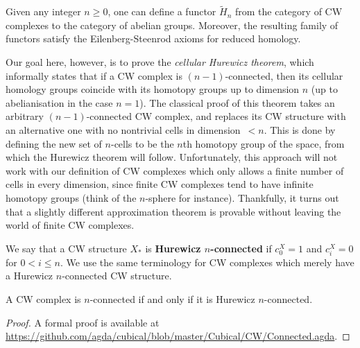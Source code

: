 \documentclass[a4page]{article}
\begin{document}
\begin{proposition}
  Given any integer \( n \ge 0 \), one can define a functor \( \widetilde{H}_n \) from the
  category of CW complexes to the category of abelian groups.
  Moreover, the resulting family of functors satisfy the Eilenberg-Steenrod axioms for reduced homology.
\end{proposition}

Our goal here, however, is to prove the \emph{cellular Hurewicz theorem}, which informally states that if a CW complex is
\( (n - 1) \)\nobreakdash-connected, then its cellular homology groups coincide with its homotopy groups up to
dimension \( n \) (up to abelianisation in the case \( n = 1 \)).
%
The classical proof of this theorem takes an arbitrary \( (n - 1) \)-connected CW complex, and replaces
its CW structure with an alternative one with no nontrivial cells in dimension~\( < n \).
%
This is done by defining the new set of \( n \)-cells to be the \( n \)th
homotopy group of the space, from which the Hurewicz theorem will follow.
%
Unfortunately, this approach will not work with our definition of CW complexes which only allows
a finite number of cells in every dimension, since finite CW complexes tend to have infinite
homotopy groups (think of the \( n \)-sphere for instance).
%
Thankfully, it turns out that a slightly different approximation theorem is provable without leaving
the world of finite CW complexes.

\begin{definition}
  We say that a CW structure $X_\ast$ is \textbf{Hurewicz $n$-connected} if $c^X_0 = 1$ and $c^X_i = 0$ for $0<i\le n$.
  We use the same terminology for CW complexes which merely have a Hurewicz $n$-connected CW structure.
\end{definition}

\begin{theorem}\label{cor:hurewicz-con}
  A CW complex is $n$-connected if and only if it is Hurewicz $n$-connected.
\end{theorem}

\begin{proof}
A formal proof is available at \url{https://github.com/agda/cubical/blob/master/Cubical/CW/Connected.agda}.
\end{proof}
\end{document}
